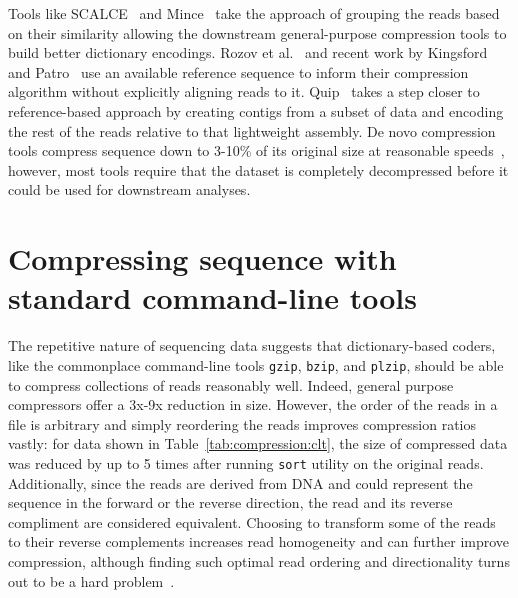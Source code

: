 \documentclass[12pt]{cmuthesis}
\makeatletter
\newcommand{\etal}{et al.\@\xspace}
\makeatother
\begin{document}
Tools like SCALCE~\cite{Sahinalp2012} and Mince~\cite{Mince} take the approach of grouping the reads based on their similarity allowing the downstream general-purpose compression tools to build better dictionary encodings. Rozov \etal~\cite{Rozov2014} and recent work by Kingsford and Patro~\cite{PathEncode} use an available reference sequence to inform their compression algorithm without explicitly aligning reads to it. Quip~\cite{Jones2012} takes a step closer to reference-based approach by creating contigs from a subset of data and encoding the rest of the reads relative to that lightweight assembly. De novo compression tools compress sequence down to 3-10\% of its original size at reasonable speeds~\cite{Deorowicz2013}, however, most tools require that the dataset is completely decompressed before it could be used for downstream analyses.


\section{Compressing sequence with standard command-line tools}

  The repetitive nature of sequencing data suggests that dictionary-based coders, like the commonplace command-line tools \texttt{gzip}, \texttt{bzip}, and \texttt{plzip}, should be able to compress collections of reads reasonably well. Indeed, general purpose compressors offer a 3x-9x reduction in size. However, the order of the reads in a file is arbitrary and simply reordering the reads improves compression ratios vastly: for data shown in Table~\ref{tab:compression:clt}, the size of compressed data was reduced by up to 5 times after running \texttt{sort} utility on the original reads. Additionally, since the reads are derived from DNA and could represent the sequence in the forward or the reverse direction, the read and its reverse compliment are considered equivalent. Choosing to transform some of the reads to their reverse complements increases read homogeneity and can further improve compression, although finding such optimal read ordering and directionality turns out to be a hard problem~\cite{PatroLCPRC}.
\end{document}
